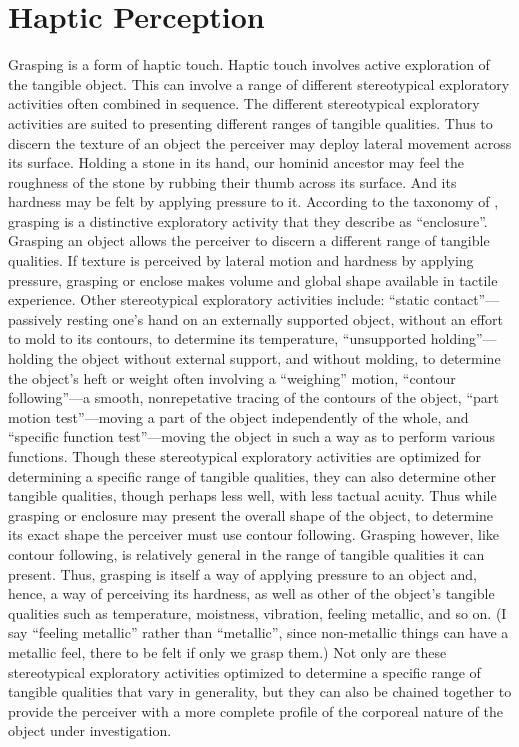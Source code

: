 
\section{Haptic Perception} %
\label{sec:haptic_perception}



Grasping is a form of haptic touch. Haptic touch involves active exploration of the tangible object. This can involve a range of different stereotypical exploratory activities often combined in sequence. The different stereotypical exploratory activities are suited to presenting different ranges of tangible qualities. Thus to discern the texture of an object the perceiver may deploy lateral movement across its surface. Holding a stone in its hand, our hominid ancestor may feel the roughness of the stone by rubbing their thumb across its surface. And its hardness may be felt by applying pressure to it. According to the taxonomy of \citet{Lederman:1987fr}, grasping is a distinctive exploratory activity that they describe as ``enclosure''. Grasping an object allows the perceiver to discern a different range of tangible qualities. If texture is perceived by lateral motion and hardness by applying pressure, grasping or enclose makes volume and global shape available in tactile experience. Other stereotypical exploratory activities include: ``static contact''---passively resting one's hand on an externally supported object, without an effort to mold to its contours, to determine its temperature, ``unsupported holding''---holding the object without external support, and without molding, to determine the object's heft or weight often involving a ``weighing'' motion, ``contour following''---a smooth, nonrepetative tracing of the contours of the object, ``part motion test''---moving a part of the object independently of the whole, and ``specific function test''---moving the object in such a way as to perform various functions. Though these stereotypical exploratory activities are optimized for determining a specific range of tangible qualities, they can also determine other tangible qualities, though perhaps less well, with less tactual acuity. Thus while grasping or enclosure may present the overall shape of the object, to determine its exact shape the perceiver must use contour following. Grasping however, like contour following, is relatively general in the range of tangible qualities it can present. Thus, grasping is itself a way of applying pressure to an object and, hence, a way of perceiving its hardness, as well as other of the object's tangible qualities such as temperature, moistness, vibration, feeling metallic, and so on. (I say ``feeling metallic'' rather than ``metallic'', since non-metallic things can have a metallic feel, there to be felt if only we grasp them.) Not only are these stereotypical exploratory activities optimized to determine a specific range of tangible qualities that vary in generality, but they can also be chained together to provide the perceiver with a more complete profile of the corporeal nature of the object under investigation.

